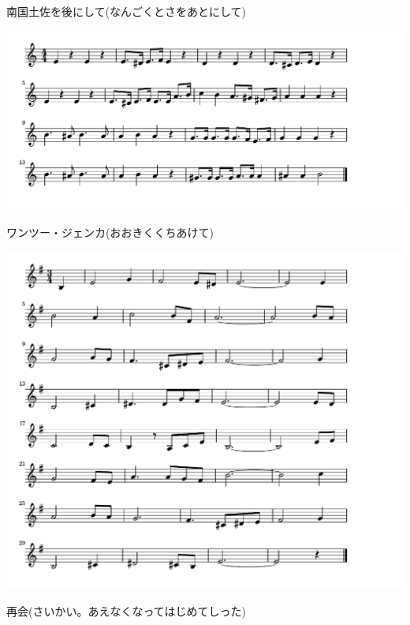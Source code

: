 \documentclass[a4paper]{ltjsarticle}
\begin{document}
\vspace{-10mm} \hspace{10mm}
南国土佐を後にして(なんごくとさをあとにして)





\includegraphics[clip]{onetwojenkka_crop.pdf}

\vspace{-10mm} \hspace{10mm}
ワンツー・ジェンカ(おおきくくちあけて)


\includegraphics[clip]{saikai_crop.pdf}

\vspace{-10mm} \hspace{10mm}
再会(さいかい。あえなくなってはじめてしった)
\end{document}
